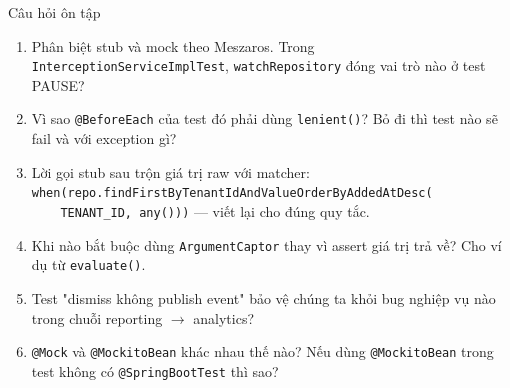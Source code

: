 \documentclass[aspectratio=169,12pt]{beamer}
\begin{document}
\begin{frame}{Câu hỏi ôn tập}
  \begin{enumerate}\small
    \item Phân biệt stub và mock theo Meszaros. Trong
      \texttt{InterceptionServiceImplTest}, \texttt{watchRepository} đóng
      vai trò nào ở test PAUSE?
    \item Vì sao \texttt{@BeforeEach} của test đó phải dùng
      \texttt{lenient()}? Bỏ đi thì test nào sẽ fail và với exception gì?
    \item Lời gọi stub sau trộn giá trị raw với matcher:\\
      \texttt{when(repo.findFirstByTenantId\-AndValue\-OrderByAddedAtDesc(}\\
      \texttt{\ \ \ \ TENANT\_ID, any()))} --- viết lại cho đúng quy tắc.
    \item Khi nào bắt buộc dùng \texttt{ArgumentCaptor} thay vì assert
      giá trị trả về? Cho ví dụ từ \texttt{evaluate()}.
    \item Test "dismiss không publish event" bảo vệ chúng ta khỏi bug
      nghiệp vụ nào trong chuỗi reporting $\to$ analytics?
    \item \texttt{@Mock} và \texttt{@MockitoBean} khác nhau thế nào?
      Nếu dùng \texttt{@MockitoBean} trong test không có
      \texttt{@SpringBootTest} thì sao?
  \end{enumerate}
\end{frame}
\end{document}
